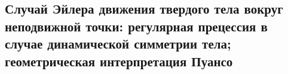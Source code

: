 

\subsection{Случай Эйлера движения твердого тела вокруг неподвижной точки: регулярная прецессия в случае динамической симметрии тела; геометрическая интерпретация Пуансо}



